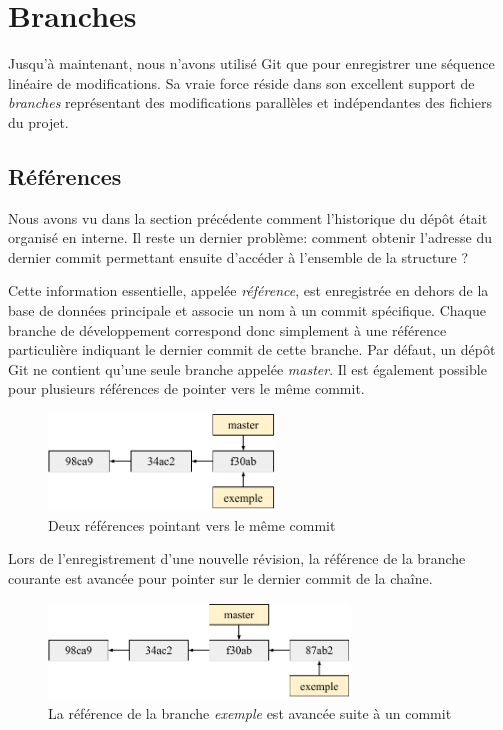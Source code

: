 \documentclass[11pt,a4paper]{article}
\begin{document}
\section{Branches}

Jusqu'à maintenant, nous n'avons utilisé Git que pour enregistrer une séquence linéaire de modifications. Sa vraie force réside dans son excellent support de \textit{branches} représentant des modifications parallèles et indépendantes des fichiers du projet.

\subsection{Références}

Nous avons vu dans la section précédente comment l'historique du dépôt était organisé en interne. Il reste un dernier problème: comment obtenir l'adresse du dernier commit permettant ensuite d'accéder à l'ensemble de la structure ?

Cette information essentielle, appelée \textit{référence}, est enregistrée en dehors de la base de données principale et associe un nom à un commit spécifique. Chaque branche de développement correspond donc simplement à une référence particulière indiquant le dernier commit de cette branche. Par défaut, un dépôt Git ne contient qu'une seule branche appelée \textit{master}. Il est également possible pour plusieurs références de pointer vers le même commit.

\begin{figure}[h]
\begin{center}
\includegraphics[width=6cm]{img_refs}
\caption{Deux références pointant vers le même commit}
\end{center}
\end{figure}

Lors de l'enregistrement d'une nouvelle révision, la référence de la branche courante est avancée pour pointer sur le dernier commit de la chaîne.

\begin{figure}[h]
\begin{center}
\includegraphics[width=8cm]{img_refs2}
\caption{La référence de la branche \textit{exemple} est avancée suite à un commit}
\end{center}
\end{figure}
\end{document}
